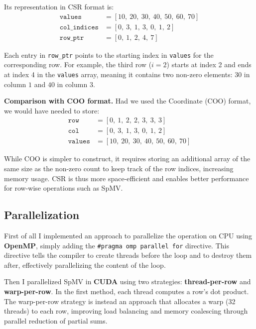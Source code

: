 \documentclass[conference]{IEEEtran}
\begin{document}
Its representation in CSR format is:
\begin{align*}
\texttt{values}      &= [10,\ 20,\ 30,\ 40,\ 50,\ 60,\ 70] \\
\texttt{col\_indices} &= [0,\ 3,\ 1,\ 3,\ 0,\ 1,\ 2] \\
\texttt{row\_ptr}     &= [0,\ 1,\ 2,\ 4,\ 7]
\end{align*}

\noindent Each entry in \texttt{row\_ptr} points to the starting index in \texttt{values} for the corresponding row. For example, the third row ($i=2$) starts at index 2 and ends at index 4 in the \texttt{values} array, meaning it contains two non-zero elements: $30$ in column $1$ and $40$ in column $3$.

\vspace{0.5em}
\noindent\textbf{Comparison with COO format.} Had we used the Coordinate (COO) format, we would have needed to store:
\begin{align*}
\texttt{row}    &= [0,\ 1,\ 2,\ 2,\ 3,\ 3,\ 3] \\
\texttt{col}    &= [0,\ 3,\ 1,\ 3,\ 0,\ 1,\ 2] \\
\texttt{values} &= [10,\ 20,\ 30,\ 40,\ 50,\ 60,\ 70]
\end{align*}

While COO is simpler to construct, it requires storing an additional array of the same size as the non-zero count to keep track of the row indices, increasing memory usage. CSR is thus more space-efficient and enables better performance for row-wise operations such as SpMV.

\subsection{Parallelization}

First of all I implemented an approach to parallelize the operation on CPU using \textbf{OpenMP}, simply adding the \texttt{\#pragma omp parallel for} directive. This directive tells the compiler to create threads before the loop and to destroy them after, effectively parallelizing the content of the loop.

Then I parallelized SpMV in \textbf{CUDA} using two strategies: \textbf{thread-per-row} and \textbf{warp-per-row}. In the first method, each thread computes a row's dot product. The warp-per-row strategy is instead an approach that allocates a warp (32 threads) to each row, improving load balancing and memory coalescing through parallel reduction of partial sums.
\end{document}
